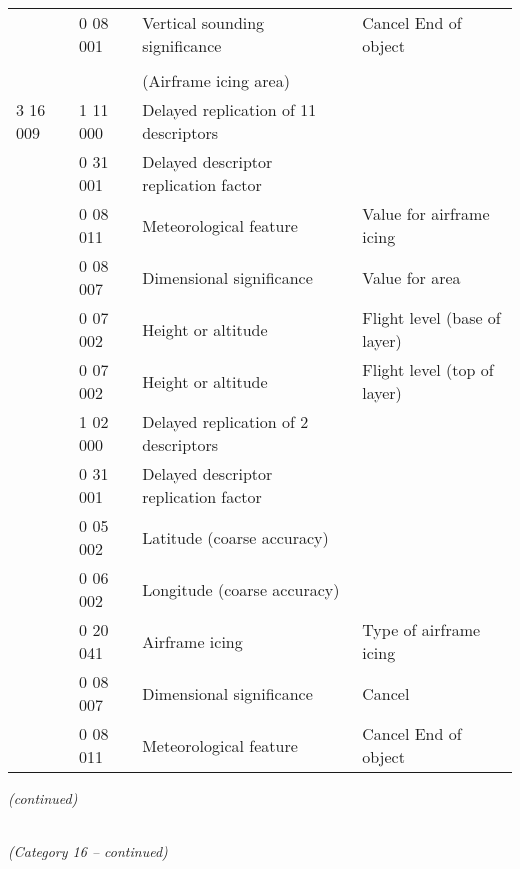 \begin{longtable}[]{@{}llll@{}}
& 0 08 001 & Vertical sounding significance & Cancel \textbf{\textbar{}} End of object\tabularnewline
& & &\tabularnewline
& & (Airframe icing area) &\tabularnewline
3 16 009 & 1 11 000 & Delayed replication of 11 descriptors &\tabularnewline
& 0 31 001 & Delayed descriptor replication factor &\tabularnewline
& 0 08 011 & Meteorological feature & Value for airframe icing\tabularnewline
& 0 08 007 & Dimensional significance & Value for area\tabularnewline
& 0 07 002 & Height or altitude & Flight level (base of layer)\tabularnewline
& 0 07 002 & Height or altitude & Flight level (top of layer)\tabularnewline
& 1 02 000 & Delayed replication of 2 descriptors &\tabularnewline
& 0 31 001 & Delayed descriptor replication factor &\tabularnewline
& 0 05 002 & Latitude (coarse accuracy) &\tabularnewline
& 0 06 002 & Longitude (coarse accuracy) &\tabularnewline
& 0 20 041 & Airframe icing & Type of airframe icing\tabularnewline
& 0 08 007 & Dimensional significance & Cancel\tabularnewline
& 0 08 011 & Meteorological feature & Cancel \textbf{\textbar{}} End of object\tabularnewline
\bottomrule
\end{longtable}

\emph{(continued)}

\emph{\\
(Category 16 -- continued)}

